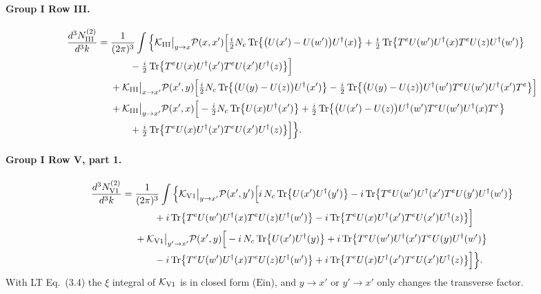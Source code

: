 \documentclass[10pt]{article}
\numberwithin{equation}{section}
\newcommand{\PP}{\mathcal P}
\newcommand{\Tr}{{\rm Tr}}
\newcommand{\Ud}{U^\dagger}
\begin{document}
\paragraph{Group I Row III.}
\begin{align}
\frac{d^3N^{(2)}_{\rm III}}{d^3k}={}&\frac{1}{(2\pi)^3}\int\Big\{\mathcal K_{\rm III}\big|_{y\to x}\PP(x,x')\Big[\tfrac{i}{2}N_c\,\Tr\big\{\big(U(x')-U(w')\big)\Ud(x)\big\}+\tfrac{i}{2}\,\Tr\big\{T^eU(w')\Ud(x)T^eU(z)\Ud(w')\big\}\notag\\
&\qquad-\tfrac{i}{2}\,\Tr\big\{T^eU(x)\Ud(x')T^eU(x')\Ud(z)\big\}\Big]\notag\\
&+\mathcal K_{\rm III}\big|_{x\to x'}\PP(x',y)\Big[\tfrac{i}{2}N_c\,\Tr\big\{\big(U(y)-U(z)\big)\Ud(x')\big\}-\tfrac{i}{2}\,\Tr\big\{\big(U(y)-U(z)\big)\Ud(w')T^eU(w')\Ud(x')T^e\big\}\Big]\notag\\
&+\mathcal K_{\rm III}\big|_{y\to x'}\PP(x',x)\Big[-\tfrac{i}{2}N_c\,\Tr\big\{U(x)\Ud(x')\big\}+\tfrac{i}{2}\,\Tr\big\{\big(U(x')-U(z)\big)\Ud(w')T^eU(w')\Ud(x)T^e\big\}\notag\\
&\qquad+\tfrac{i}{2}\,\Tr\big\{T^eU(x)\Ud(x')T^eU(x')\Ud(z)\big\}\Big]\Big\}.
\end{align}
\paragraph{Group I Row V, part 1.}
\begin{align}
\frac{d^3N^{(2)}_{\rm V1}}{d^3k}={}&\frac{1}{(2\pi)^3}\int\Big\{\mathcal K_{\rm V1}\big|_{y\to x'}\PP(x',y')\Big[i\,N_c\,\Tr\big\{U(x')\Ud(y')\big\}-i\,\Tr\big\{T^eU(w')\Ud(x')T^eU(y')\Ud(w')\big\}\notag\\
&\qquad+i\,\Tr\big\{T^eU(w')\Ud(x)T^eU(z)\Ud(w')\big\}-i\,\Tr\big\{T^eU(x)\Ud(x')T^eU(x')\Ud(z)\big\}\Big]\notag\\
&+\mathcal K_{\rm V1}\big|_{y'\to x'}\PP(x',y)\Big[-i\,N_c\,\Tr\big\{U(x')\Ud(y)\big\}+i\,\Tr\big\{T^eU(w')\Ud(x')T^eU(y)\Ud(w')\big\}\notag\\
&\qquad-i\,\Tr\big\{T^eU(w')\Ud(x)T^eU(z)\Ud(w')\big\}+i\,\Tr\big\{T^eU(x)\Ud(x')T^eU(x')\Ud(z)\big\}\Big]\Big\}.
\end{align}
With LT Eq.~(3.4) the $\xi$ integral of $\mathcal K_{\rm V1}$ is in closed form ($\mathrm{Ein}$), and $y\to x'$ or $y'\to x'$ only changes the transverse factor.
\end{document}
